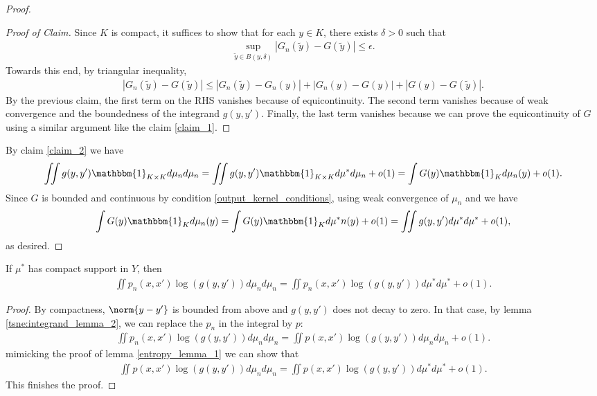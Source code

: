 \begin{proof}
    \begin{proof}[Proof of Claim]
        Since $K$ is compact, it suffices to show that for each $y \in K$, there exists $\delta>0$ such that
        \begin{align}
            \sup_{\tilde{y}\in B(y,\delta)} |G_n(\tilde{y})-G(\tilde{y})| \leq \epsilon.
        \end{align}
        Towards this end, by triangular inequality,
        \begin{align}
            |G_n(\tilde{y})-G(\tilde{y})| \leq |G_n(\tilde{y})-G_n(y)|+|G_n(y)-G(y)|+|G(y)-G(\tilde{y})|.
        \end{align}
        By the previous claim, the first term on the RHS vanishes because of equicontinuity. The second term vanishes because of weak convergence and the boundedness of the integrand $g(y,y')$. Finally, the last term vanishes because we can prove the equicontinuity of $G$ using a similar argument like the claim \ref{claim_1}.
    \end{proof}
    By claim \ref{claim_2} we have
    \begin{align}
        \iint g(y,y') \mathbbm{1}_{K \times K} d\mu_n d\mu_n = \iint g(y,y') \mathbbm{1}_{K \times K} d\mu^* d\mu_n +o(1) = \int G(y) \mathbbm{1}_K d\mu_n(y)+o(1).
    \end{align}
    Since $G$ is bounded and continuous by condition \ref{output_kernel_conditions}, using weak convergence of $\mu_n$ and we have
    \begin{align}
        \int G(y) \mathbbm{1}_K d\mu_n(y) = \int G(y) \mathbbm{1}_K d\mu^*n(y) + o(1) = \iint g(y,y')d\mu^* d\mu^* + o(1),
    \end{align}
    as desired.
\end{proof}
\begin{lemma}
    If $\mu^*$ has compact support in $Y$, then
    \begin{align}
        \iint p_n(x,x') \log(g(y,y')) d\mu_n d\mu_n = \iint p_n(x,x') \log(g(y,y')) d\mu^* d\mu^* +o(1).
    \end{align}
\end{lemma}
\begin{proof}
    By compactness, $\norm{y-y'}$ is bounded from above and $g(y,y')$ does not decay to zero. In that case, by lemma \ref{tsne:integrand_lemma_2}, we can replace the $p_n$ in the integral by $p$:
    \begin{align}
        \iint p_n(x,x') \log(g(y,y')) d\mu_n d\mu_n = \iint p(x,x') \log(g(y,y')) d\mu_n d\mu_n + o(1).
    \end{align}
    mimicking the proof of lemma \ref{entropy_lemma_1} we can show that
    \begin{align}
        \iint p(x,x') \log(g(y,y')) d\mu_n d\mu_n = \iint p(x,x') \log(g(y,y')) d\mu^* d\mu^* + o(1).
    \end{align}
    This finishes the proof.
\end{proof}

